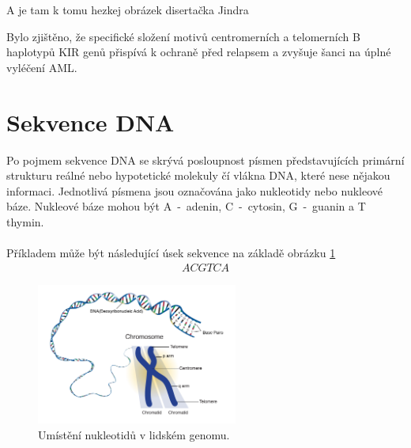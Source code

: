 \documentclass[czech,DP]{thesiskiv}
\begin{document}
A je tam k tomu hezkej obrázek disertačka Jindra


Bylo zjištěno, že
specifické složení motivů centromerních a telomerních B haplotypů KIR genů přispívá
k ochraně před relapsem a zvyšuje šanci na úplné vyléčení AML.


\section{Sekvence DNA}
Po pojmem sekvence DNA se skrývá posloupnost písmen představujících primární strukturu reálné nebo hypotetické molekuly čí vlákna DNA, které nese nějakou informaci. Jednotlivá písmena jsou označována jako nukleotidy nebo nukleové báze. Nukleové báze mohou být A~-~adenin, C~-~cytosin, G~-~guanin a T thymin. \cite{genome_gov}
\\
\\
\noindent
Příkladem může být následující úsek sekvence na základě obrázku \ref{fig:chrmosome_sekvence} 
\begin{align}
   \label{sekvence_prikad} ACGTCA
\end{align}

\begin{figure}[H]		
		\centering
		\includegraphics[width=250px]{./img/chromosome.jpg}
		\caption{Umístění nukleotidů v lidském genomu. \cite{chromosome_structure}}
		\label{fig:chrmosome_sekvence}
\end{figure}
\end{document}
